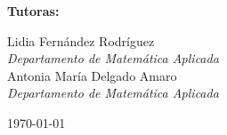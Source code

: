 \begin{titlepage}
	\vfill
	\begin{minipage}[t][1cm][t]{1.7cm}
	{\large  {\bf Tutoras:}}
	\end{minipage}\hfill
	\begin{minipage}[t][1cm][t]{7cm}
	{\large Lidia Fernández Rodríguez\\
	\emph{Departamento de Matemática Aplicada}}\\[.7em]
	{\large Antonia María Delgado Amaro\\
	\emph{Departamento de Matemática Aplicada}}
	\end{minipage}\hfill
	\begin{minipage}[t][1cm][t]{5cm}
	\large{\today}
	\end{minipage}
	\vspace{2cm}
	
\end{titlepage}
